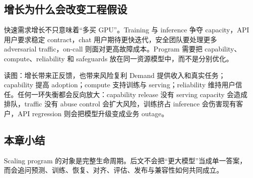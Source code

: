 \subsection{增长为什么会改变工程假设}

快速需求增长不只意味着“多买 GPU”。Training 与 inference 争夺 capacity，API 用户要求稳定 contract，chat 用户期待更快迭代，安全团队要处理更多 adversarial traffic，on-call 则面对更高故障成本。Program 需要把 capability、compute、reliability 和 safeguards 放在同一资源模型中，而不是分别优化。


\begin{knowledgebox}{读图：增长带来正反馈，也带来风险复利}
Demand 提供收入和真实任务；capability 提高 adoption；compute 支持训练与 serving；reliability 维持用户信任。任何一环失衡都会反向放大：capability release 没有 serving capacity 会造成排队，traffic 没有 abuse control 会扩大风险，训练挤占 inference 会伤害现有客户，API regression 则会把模型升级变成业务 outage。
\end{knowledgebox}

\subsection{本章小结}

Scaling program 的对象是完整生命周期。后文不会把“更大模型”当成单一答案，而会追问预测、训练、恢复、对齐、评估、发布与兼容性如何共同成立。

